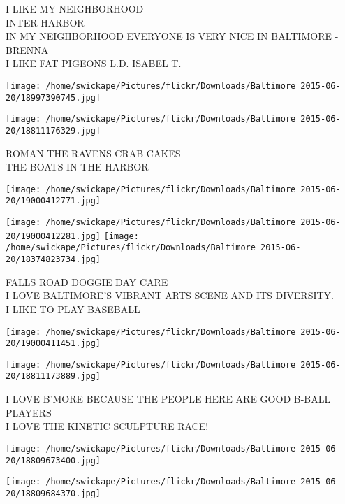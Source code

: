 \documentclass[10pt,letterpaper]{article}
\begin{document}
I LIKE MY NEIGHBORHOOD\\
INTER HARBOR\\
IN MY NEIGHBORHOOD EVERYONE IS VERY NICE IN BALTIMORE {-} BRENNA\\
I LIKE FAT PIGEONS L.D. ISABEL T.\\
\pagebreak

\texttt{[image: /home/swickape/Pictures/flickr/Downloads/Baltimore 2015-06-20/18997390745.jpg]}

\vspace{0.25in}
\texttt{[image: /home/swickape/Pictures/flickr/Downloads/Baltimore 2015-06-20/18811176329.jpg]}

ROMAN THE RAVENS CRAB CAKES\\
THE BOATS IN THE HARBOR\\
\pagebreak

\texttt{[image: /home/swickape/Pictures/flickr/Downloads/Baltimore 2015-06-20/19000412771.jpg]}

\vspace{0.25in}
\texttt{[image: /home/swickape/Pictures/flickr/Downloads/Baltimore 2015-06-20/19000412281.jpg]}
\texttt{[image: /home/swickape/Pictures/flickr/Downloads/Baltimore 2015-06-20/18374823734.jpg]}

FALLS ROAD DOGGIE DAY CARE\\
I LOVE BALTIMORE'S VIBRANT ARTS SCENE AND ITS DIVERSITY.\\
I LIKE TO PLAY BASEBALL\\
\pagebreak

\texttt{[image: /home/swickape/Pictures/flickr/Downloads/Baltimore 2015-06-20/19000411451.jpg]}

\vspace{0.25in}
\texttt{[image: /home/swickape/Pictures/flickr/Downloads/Baltimore 2015-06-20/18811173889.jpg]}

I LOVE B'MORE BECAUSE THE PEOPLE HERE ARE GOOD B{-}BALL PLAYERS\\
I LOVE THE KINETIC SCULPTURE RACE!\\
\pagebreak

\texttt{[image: /home/swickape/Pictures/flickr/Downloads/Baltimore 2015-06-20/18809673400.jpg]}

\vspace{0.25in}
\texttt{[image: /home/swickape/Pictures/flickr/Downloads/Baltimore 2015-06-20/18809684370.jpg]}
\end{document}
